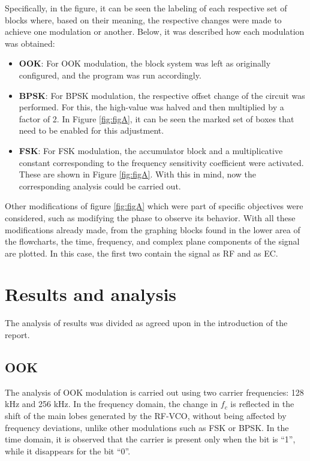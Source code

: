 \documentclass{journal}[IEEEtran, twocolumn]             %
\begin{document}
\begin{multicols}{2}
Specifically, in the figure, it can be seen the labeling of each respective set of blocks where, based on their meaning, the respective changes were made to achieve one modulation or another. Below, it was described how each modulation was obtained:

\begin{itemize}

\item \textbf{OOK}:
For OOK modulation, the block system was left as originally configured, and the program was run accordingly.

\item \textbf{BPSK}:
For BPSK modulation, the respective offset change of the circuit was performed. For this, the high-value was halved and then multiplied by a factor of 2. In Figure \ref{fig:figA}, it can be seen the marked set of boxes that need to be enabled for this adjustment.

\item \textbf{FSK}:
For FSK modulation, the accumulator block and a multiplicative constant corresponding to the frequency sensitivity coefficient were activated. These are shown in Figure \ref{fig:figA}. With this in mind, now the corresponding analysis could be carried out.

\end{itemize}

Other modifications of figure \ref{fig:figA} which were part of specific objectives were considered, such as modifying the phase to observe its behavior. With all these modifications already made, from the graphing blocks found in the lower area of the flowcharts, the time, frequency, and complex plane components of the signal are plotted. In this case, the first two contain the signal as RF and as EC.

\section{Results and analysis}

The analysis of results was divided as agreed upon in the introduction of the report.

\subsection{OOK}

The analysis of OOK modulation is carried out using two carrier frequencies: 
128 kHz and 256 kHz. In the frequency domain, the change in $f_c$ is reflected in the 
shift of the main lobes generated by the RF-VCO, without being affected by frequency 
deviations, unlike other modulations such as FSK or BPSK. In the time domain, it is 
observed that the carrier is present only when the bit is “1”, while it disappears 
for the bit “0”.


\end{multicols}
\end{document}
